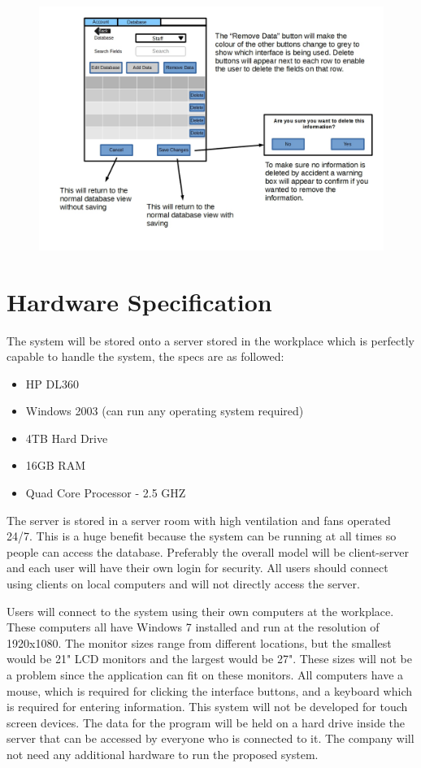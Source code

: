 \begin{figure}[H]
\includegraphics[width=\textwidth]{GUI_Design14.jpg}
\caption{}
\end{figure}


\section {Hardware Specification}

The system will be stored onto a server stored in the workplace which is perfectly capable to handle the system, the specs are as followed:
\begin{itemize}
\item HP DL360
\item Windows 2003 (can run any operating system required)
\item 4TB Hard Drive
\item 16GB RAM
\item Quad Core Processor - 2.5 GHZ
\end{itemize}
The server is stored in a server room with high ventilation and fans operated 24/7. This is a huge benefit because the system can be running at all times so people can access the database. Preferably the overall model will be client-server and each user will have their own login for security. All users should connect using clients on local computers and will not directly access the server.

Users will connect to the system using their own computers at the workplace. These computers all have Windows 7 installed and run at the resolution of 1920x1080. The monitor sizes range from different locations, but the smallest would be 21" LCD monitors and the largest would be 27". These sizes will not be a problem since the application can fit on these monitors. All computers have a mouse, which is required for clicking the interface buttons, and a keyboard which is required for entering information. This system will not be developed for touch screen devices. The data for the program will be held on a hard drive inside the server that can be accessed by everyone who is connected to it. The company will not need any additional hardware to run the proposed system.

